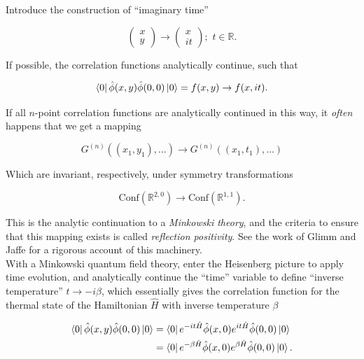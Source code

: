 \noindent Introduce the construction of ``imaginary time''

\begin{equation}
\begin{pmatrix} x \\ y \end{pmatrix} \rightarrow \begin{pmatrix} x \\ it \end{pmatrix}; \,\, t \in \mathbb{R}.
\end{equation}

\noindent If possible, the correlation functions analytically continue, such that

\begin{equation}
\bra{0} \hat{\phi} (x,y) \hat{\phi} (0,0) \ket{0} = f(x,y) \rightarrow f(x,it).
\end{equation}

\noindent If all $n$-point correlation functions are analytically continued in this way, it \textit{often} happens that we get a mapping

\begin{equation}
G^{(n)} ((x_1,y_1), \dots) \rightarrow G^{(n)} ((x_1,t_1), \dots)
\end{equation}

\noindent Which are invariant, respectively, under symmetry transformations

\begin{equation}
\text{Conf}(\mathbb{R}^{2,0}) \rightarrow \text{Conf}(\mathbb{R}^{1,1}).
\end{equation}

\noindent This is the analytic continuation to a \textit{Minkowski theory}, and the criteria to ensure that this mapping exists is called \textit{reflection positivity}. See the work of Glimm and Jaffe for a rigorous account of this machinery. \\

\noindent With a Minkowski quantum field theory, enter the Heisenberg picture to apply time evolution, and analytically continue the ``time'' variable to define ``inverse temperature'' $t \rightarrow -i\beta$, which essentially gives the correlation function for the thermal state of the Hamiltonian $\hat{H}$ with inverse temperature $\beta$

\begin{align}
\bra{0} \hat{\phi} (x,y) \hat{\phi} (0,0) \ket{0} &= \bra{0} e^{-it \hat{H}} \hat{\phi} (x,0) e^{it\hat{H}} \hat{\phi} (0,0) \ket{0} \\
&= \bra{0} e^{-\beta \hat{H}} \hat{\phi} (x,0) e^{\beta \hat{H}} \hat{\phi} (0,0) \ket{0}.
\end{align}

